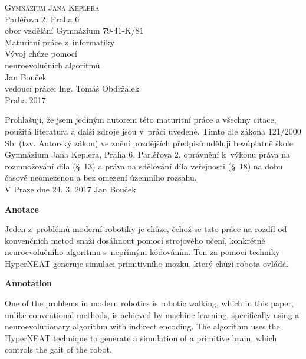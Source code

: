 \documentclass[a4]{article}
\begin{document}
 
 
\begin{titlepage} 
\begin{center} 
{\huge\textsc{Gymnázium Jana Keplera}\\}
{\large{Parléřova 2, Praha 6}}\\
{\large{obor vzdělání Gymnázium 79-41-K/81}\\[5cm]} 
{\Large{Maturitní práce z~informatiky}\\[0.2cm]}
{\Huge{Vývoj chůze pomocí\\neuroevolučních algoritmů}}\\\vfill
{\Large{Jan Bouček}\\} 
{\large{vedoucí práce: Ing. Tomáš Obdržálek}\\} 
{\large{Praha 2017}} 
\end{center} 
\end{titlepage} 
 
\newpage 
Prohlašuji, že jsem jediným autorem této maturitní práce a všechny citace, použitá literatura a další zdroje jsou v~práci uvedené. Tímto dle zákona 121/2000 Sb. (tzv. Autorský zákon) ve znění pozdějších předpisů uděluji bezúplatně škole Gymnázium Jana Keplera, Praha 6, Parléřova 2, oprávnění k~výkonu práva na rozmnožování díla (§~13) a práva na sdělování díla veřejnosti (§~18) na dobu časově neomezenou a bez omezení územního rozsahu.\\[0.7cm] 
\vspace{10cm} 
{\large{V Praze dne 24. 3. 2017} \hfill Jan Bouček} 
\newpage 
\tableofcontents
\newpage
{\Large\textbf{Anotace}\par}
Jeden z~problémů moderní robotiky je chůze, čehož se tato práce na rozdíl od konvenčních metod snaží dosáhnout pomocí strojového učení, konkrétně neuroevolučního algoritmu s~nepřímým kódováním. Ten za pomoci techniky HyperNEAT generuje simulaci primitivního mozku, který chůzi robota ovládá.\par 

{\Large\textbf{Annotation}\par}
One of the problems in modern robotics is robotic walking, which in this paper, unlike conventional methods, is achieved by machine learning, specifically using a neuroevolutionary algorithm with indirect encoding. The algorithm uses the HyperNEAT technique to generate a simulation of a primitive brain, which controls the gait of the robot.\par  
\end{document}
